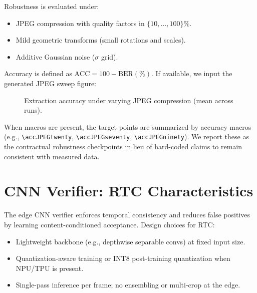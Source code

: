 Robustness is evaluated under:
\begin{itemize}
    \item JPEG compression with quality factors in \(\{10,\dots,100\}\%\).
    \item Mild geometric transforms (small rotations and scales).
    \item Additive Gaussian noise (\(\sigma\) grid).
\end{itemize}

Accuracy is defined as \(\mathrm{ACC}=100-\mathrm{BER}(\%)\).
If available, we input the generated JPEG sweep figure:

\begin{figure}[htbp]
    \centering
    \caption[Extraction accuracy vs JPEG]{Extraction accuracy under varying JPEG compression (mean across runs).}
    \label{fig:accuracy_jpeg}
\end{figure}

When macros are present, the target points are summarized by accuracy macros (e.g., \texttt{\textbackslash accJPEGtwenty}, \texttt{\textbackslash accJPEGseventy}, \texttt{\textbackslash accJPEGninety}). We report these as the contractual robustness checkpoints in lieu of hard-coded claims to remain consistent with measured data.


\section{CNN Verifier: RTC Characteristics}
\label{sec:validation:cnn}

The edge CNN verifier enforces temporal consistency and reduces false positives by learning content-conditioned acceptance. Design choices for RTC:
\begin{itemize}
    \item Lightweight backbone (e.g., depthwise separable convs) at fixed input size.
    \item Quantization-aware training or INT8 post-training quantization when NPU/TPU is present.
    \item Single-pass inference per frame; no ensembling or multi-crop at the edge.
\end{itemize}

